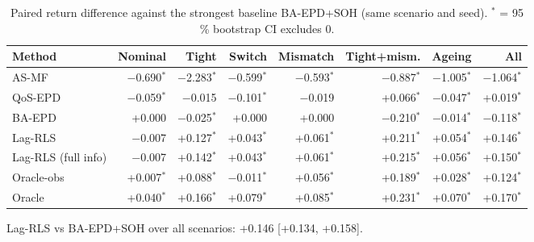 \begin{table}[t]
\centering
\caption{Paired return difference against the strongest baseline BA-EPD+SOH (same scenario and seed). $^{*}$ = 95 \% bootstrap CI excludes 0.}
\label{tab:paired}
\footnotesize
\setlength{\tabcolsep}{4pt}
\begin{tabular}{lrrrrrrr}
\toprule
Method & Nominal & Tight & Switch & Mismatch & Tight+mism. & Ageing & All \\
\midrule
AS-MF & $-$0.690$^{*}$ & $-$2.283$^{*}$ & $-$0.599$^{*}$ & $-$0.593$^{*}$ & $-$0.887$^{*}$ & $-$1.005$^{*}$ & $-$1.064$^{*}$ \\
QoS-EPD & $-$0.059$^{*}$ & $-$0.015 & $-$0.101$^{*}$ & $-$0.019 & +0.066$^{*}$ & $-$0.047$^{*}$ & +0.019$^{*}$ \\
BA-EPD & +0.000 & $-$0.025$^{*}$ & +0.000 & +0.000 & $-$0.210$^{*}$ & $-$0.014$^{*}$ & $-$0.118$^{*}$ \\
\midrule
Lag-RLS & $-$0.007 & +0.127$^{*}$ & +0.043$^{*}$ & +0.061$^{*}$ & +0.211$^{*}$ & +0.054$^{*}$ & +0.146$^{*}$ \\
\midrule
Lag-RLS (full info) & $-$0.007 & +0.142$^{*}$ & +0.043$^{*}$ & +0.061$^{*}$ & +0.215$^{*}$ & +0.056$^{*}$ & +0.150$^{*}$ \\
Oracle-obs & +0.007$^{*}$ & +0.088$^{*}$ & $-$0.011$^{*}$ & +0.056$^{*}$ & +0.189$^{*}$ & +0.028$^{*}$ & +0.124$^{*}$ \\
Oracle & +0.040$^{*}$ & +0.166$^{*}$ & +0.079$^{*}$ & +0.085$^{*}$ & +0.231$^{*}$ & +0.070$^{*}$ & +0.170$^{*}$ \\
\bottomrule
\end{tabular}
\par\vspace{2pt}\parbox{\linewidth}{\scriptsize Lag-RLS vs BA-EPD+SOH over all scenarios: +0.146 [+0.134, +0.158].}
\end{table}
